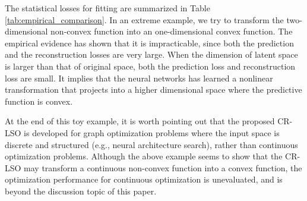 \documentclass[10pt,twocolumn,letterpaper]{article}
\begin{document}
The statistical losses for fitting  are summarized in Table \ref{tab:empirical_comparison}. In an extreme example, we try to transform the two-dimensional non-convex function into an one-dimensional convex function. The empirical evidence has shown that it is impracticable, since both the prediction and the reconstruction losses are very large. When the dimension of latent space is larger than that of original space, both the prediction loss and reconstruction loss are small. It implies that the neural networks has learned a nonlinear transformation that projects  into a higher dimensional space where the predictive function is convex.  

At the end of this toy example, it is worth pointing out that the proposed CR-LSO is developed for graph optimization problems where the input space is discrete and structured (e.g., neural architecture search), rather than continuous optimization problems. Although the above example seems to show that the CR-LSO may transform a continuous non-convex function into a convex function, the optimization performance for continuous optimization is unevaluated, and is beyond the discussion topic of this paper. 
\end{document}
